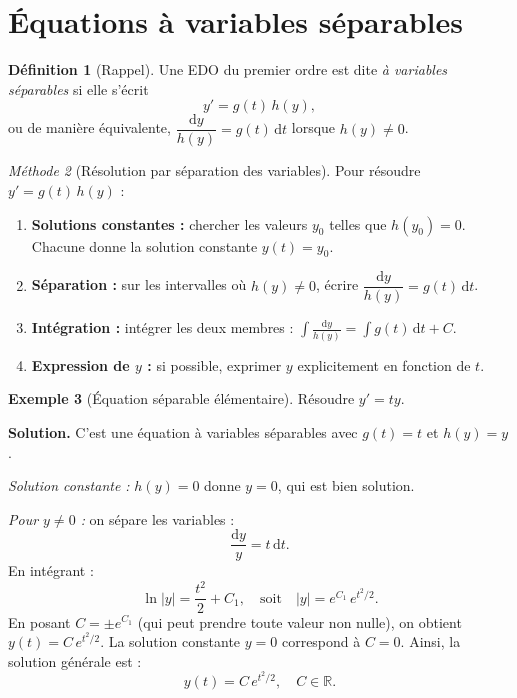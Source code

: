 \documentclass[12pt,a4paper,openany]{book}
\theoremstyle{definition}
\newtheorem{definition}{Définition}[chapter]
\newtheorem{exemple}[definition]{Exemple}
\theoremstyle{plain}
\theoremstyle{remark}
\newtheorem{methode}[definition]{Méthode}
\newcommand{\R}{\mathbb{R}}
\newcommand{\dd}{\mathrm{d}}
\newcommand{\abs}[1]{\left|#1\right|}
\begin{document}
\section{Équations à variables séparables}
\label{sec:separables}

\begin{definition}[Rappel]
\label{def:separable-rappel}
Une EDO du premier ordre est dite \emph{à variables séparables} si elle s'écrit
\[
y' = g(t)\,h(y),
\]
ou de manière équivalente, $\dfrac{\dd y}{h(y)} = g(t)\,\dd t$ lorsque $h(y) \neq 0$.
\end{definition}

\begin{methode}[Résolution par séparation des variables]
\label{meth:separation}
Pour résoudre $y' = g(t)\,h(y)$ :
\begin{enumerate}
\item \textbf{Solutions constantes :} chercher les valeurs $y_0$ telles que $h(y_0) = 0$. Chacune donne la solution constante $y(t) = y_0$.
\item \textbf{Séparation :} sur les intervalles où $h(y) \neq 0$, écrire $\dfrac{\dd y}{h(y)} = g(t)\,\dd t$.
\item \textbf{Intégration :} intégrer les deux membres : $\displaystyle\int \frac{\dd y}{h(y)} = \int g(t)\,\dd t + C$.
\item \textbf{Expression de $y$ :} si possible, exprimer $y$ explicitement en fonction de $t$.
\end{enumerate}
\end{methode}

\begin{exemple}[Équation séparable élémentaire]
\label{ex:separable-1}
Résoudre $y' = ty$.

\textbf{Solution.} C'est une équation à variables séparables avec $g(t) = t$ et $h(y) = y$.

\textit{Solution constante :} $h(y) = 0$ donne $y = 0$, qui est bien solution.

\textit{Pour $y \neq 0$ :} on sépare les variables :
\[
\frac{\dd y}{y} = t\,\dd t.
\]
En intégrant :
\[
\ln\abs{y} = \frac{t^2}{2} + C_1, \quad \text{soit} \quad \abs{y} = e^{C_1}\,e^{t^2/2}.
\]
En posant $C = \pm e^{C_1}$ (qui peut prendre toute valeur non nulle), on obtient $y(t) = C\,e^{t^2/2}$. La solution constante $y = 0$ correspond à $C = 0$. Ainsi, la solution générale est :
\[
\boxed{y(t) = C\,e^{t^2/2}, \quad C \in \R.}
\]
\end{exemple}
\end{document}
